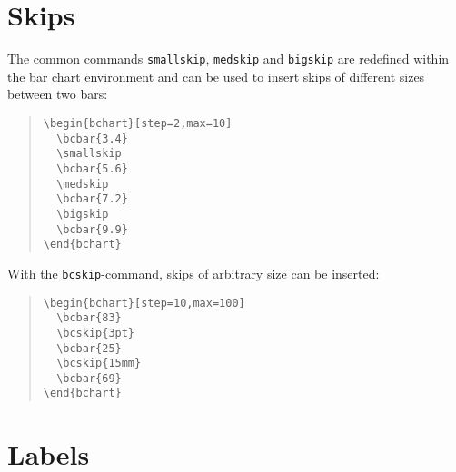 \documentclass{article}
\begin{document}
\section{Skips}

The common commands \texttt{smallskip}, \texttt{medskip} and \texttt{bigskip} are redefined within the bar chart environment and can be used to insert skips of different sizes between two bars:
\begin{quote}\small
\begin{verbatim}
\begin{bchart}[step=2,max=10]
  \bcbar{3.4}
  \smallskip
  \bcbar{5.6}
  \medskip
  \bcbar{7.2}
  \bigskip
  \bcbar{9.9}
\end{bchart}
\end{verbatim}
\end{quote}
\begin{quote}
\begin{bchart}[step=2,max=10]
  \smallskip
  \medskip
  \bigskip
\end{bchart}
\end{quote}
With the \texttt{bcskip}-command, skips of arbitrary size can be inserted:
\begin{quote}\small
\begin{verbatim}
\begin{bchart}[step=10,max=100]
  \bcbar{83}
  \bcskip{3pt}
  \bcbar{25}
  \bcskip{15mm}
  \bcbar{69}
\end{bchart}
\end{verbatim}
\end{quote}
\begin{quote}
\begin{bchart}[step=10,max=100]
  \bcskip{3pt}
  \bcskip{15mm}
\end{bchart}
\end{quote}


\section{Labels}
\end{document}
